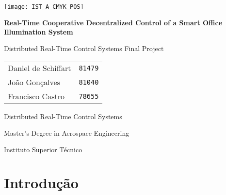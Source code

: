 \documentclass{article}
\begin{document}
\begin{titlepage}

\begin{center}
	\vspace*{0.1\textheight}
	\texttt{[image: IST\_A\_CMYK\_POS]}
	
	\vspace*{0.1\textheight}
	{\huge\bfseries Real-Time Cooperative Decentralized Control of a Smart Office Illumination System}
	
	\vspace*{0.03\textheight}
	{\Large Distributed Real-Time Control Systems Final Project}
	
	\vspace*{43.5mm}
	{\Large \begin{tabular}{l r} Daniel de Schiffart & \texttt{81479} \\ João Gonçalves & \texttt{81040} \\ Francisco Castro & \texttt{78655}\end{tabular}}
	
	\vspace{\fill}
	{\large Distributed Real-Time Control Systems}
	
	\vspace*{0.01\textheight}
	{\Large Master's Degree in Aerospace Engineering}
	
	\vspace*{0.01\textheight}
	{\large Instituto Superior Técnico}
\end{center}

\end{titlepage}
\setcounter{page}{1}

{\hypersetup{linkcolor = black} \tableofcontents}

\section{Introdução}

\end{document}
